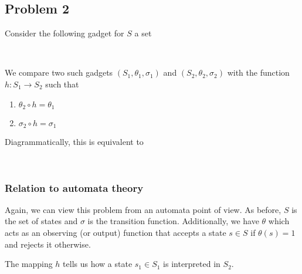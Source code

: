 \subsection{Problem 2}
Consider the following gadget for $S$ a set
\begin{center}
     \\[3mm]
\end{center}
We compare two such gadgets $(S_1, \theta_1, \sigma_1)$ and $(S_2, \theta_2, \sigma_2)$
with the function $h: S_1 \to S_2$ such that
\begin{enumerate}
    \item $\theta_2 \circ h = \theta_1$
    \item $\sigma_2 \circ h = \sigma_1$
\end{enumerate}
Diagrammatically, this is equivalent to
\begin{center}
     \\[3mm]
\end{center}

\subsubsection{Relation to automata theory}
Again, we can view this problem from an automata point of view. As before, $S$
is the set of states and $\sigma$ is the transition function. Additionally, we
have $\theta$ which acts as an observing (or output) function that accepts a
state $s \in S$ if $\theta(s) = 1$ and rejects it otherwise.

The mapping $h$ tells us how a state $s_1 \in S_1$ is interpreted in $S_2$.

